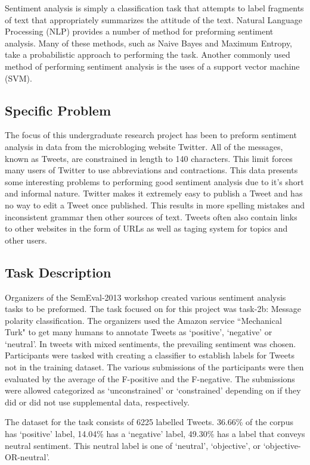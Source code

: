 \documentclass[12pt]{article}
\begin{document}
Sentiment analysis is simply a classification task that attempts to label
fragments of text that appropriately summarizes the attitude of the text.
Natural Language Processing (NLP) provides a number of method for preforming
sentiment analysis. Many of these methods, such as Naive Bayes and Maximum
Entropy, take a probabilistic approach to performing the task. Another commonly
used method of performing sentiment analysis is the uses of a support vector
machine (SVM).


\subsection{Specific Problem}

The focus of this undergraduate research project has been to preform sentiment
analysis in data from the microbloging website Twitter. All of the messages,
known as Tweets, are constrained in length to 140 characters. This limit forces
many users of Twitter to use abbreviations and contractions. This data presents
some interesting problems to performing good sentiment analysis due to it's
short and informal nature. Twitter makes it extremely easy to publish a Tweet
and has no way to edit a Tweet once published. This results in more spelling
mistakes and inconsistent grammar then other sources of text. Tweets often also
contain links to other websites in the form of URLs as well as taging system
for topics and other users.

\subsection{Task Description}

Organizers of the SemEval-2013 workshop created various sentiment analysis
tasks to be preformed. The task focused on for this project was task-2b:
Message polarity classification. The organizers used the Amazon service
``Mechanical Turk" to get many humans to annotate Tweets as `positive',
`negative' or `neutral'. In tweets with mixed sentiments, the prevailing
sentiment was chosen. Participants were tasked with creating a classifier to
establish labels for Tweets not in the training dataset. The various
submissions of the participants were then evaluated by the average of the
F-positive and the F-negative. The submissions were allowed categorized as
`unconstrained' or `constrained' depending on if they did or did not use
supplemental data, respectively.

The dataset for the task consists of 6225 labelled Tweets. 36.66\% of the
corpus has `positive' label, 14.04\% has a `negative' label, 49.30\% has a
label that conveys neutral sentiment. This neutral label is one of `neutral',
`objective', or `objective-OR-neutral'.
\end{document}
